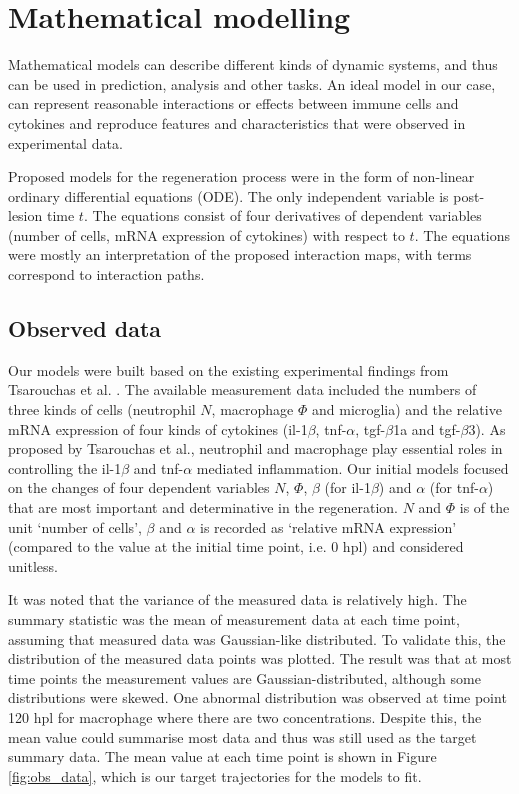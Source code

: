 \chapter{Mathematical modelling}

Mathematical models can describe different kinds of dynamic systems, and thus can be used in prediction, analysis and other tasks. An ideal model in our case, can represent reasonable interactions or effects between immune cells and cytokines and reproduce features and characteristics that were observed in experimental data.

Proposed models for the regeneration process were in the form of non-linear ordinary differential equations (ODE). The only independent variable is post-lesion time $t$. The equations consist of four derivatives of dependent variables (number of cells, mRNA expression of cytokines) with respect to $t$. The equations were mostly an interpretation of the proposed interaction maps, with terms correspond to interaction paths.


\section{Observed data}

Our models were built based on the existing experimental findings from Tsarouchas et al. \cite{ref:Tsarouchas}. The available measurement data included the numbers of three kinds of cells (neutrophil $N$, macrophage $\Phi$ and microglia) and the relative mRNA expression of four kinds of cytokines (il-1$\beta$, tnf-$\alpha$, tgf-$\beta$1a and tgf-$\beta$3). As proposed by Tsarouchas et al., neutrophil and macrophage play essential roles in controlling the il-1$\beta$ and tnf-$\alpha$ mediated inflammation. Our initial models focused on the changes of four dependent variables $N$, $\Phi $, $\beta$ (for il-1$\beta$) and $\alpha$ (for tnf-$\alpha$) that are most important and determinative in the regeneration. $N$ and $\Phi$ is of the unit `number of cells', $\beta$ and $\alpha$ is recorded as `relative mRNA expression' (compared to the value at the initial time point, i.e. 0 hpl) and considered unitless.

It was noted that the variance of the measured data is relatively high. The summary statistic was the mean of measurement data at each time point, assuming that measured data was Gaussian-like distributed. To validate this, the distribution of the measured data points was plotted. The result was that at most time points the measurement values are Gaussian-distributed, although some distributions were skewed. One abnormal distribution was observed at time point 120 hpl for macrophage where there are two concentrations. Despite this, the mean value could summarise most data and thus was still used as the target summary data. The mean value at each time point is shown in Figure \ref{fig:obs_data}, which is our target trajectories for the models to fit.

